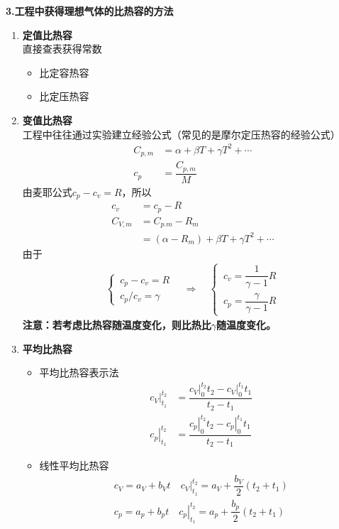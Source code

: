 \noindent \textbf{3.工程中获得理想气体的比热容的方法}
\vspace*{-0.5em}
\begin{enumerate}
	\item \textbf{定值比热容}\\
	直接查表获得常数
	\vspace*{-0.5em}
	\begin{itemize}
		\item 比定容热容
		\item 比定压热容
	\end{itemize}

	\item \textbf{变值比热容}\\
	工程中往往通过实验建立经验公式（常见的是摩尔定压热容的经验公式）
	\begin{align}
		C_{p,m} &= \alpha + \beta T + \gamma T^2 + \cdots\\
		c_p &= \dfrac{C_{p,m}}{M}
	\end{align}
	由麦耶公式$c_p - c_v = R$，所以
	\begin{align}
		c_v &= c_p - R\\
		C_{V,m} &= C_{p.m} - R_m \\
		&= (\alpha - R_m) + \beta T + \gamma T^2 + \cdots
	\end{align}
	由于
	\begin{align*}
		\begin{cases}
			\, c_p - c_v = R\\
			\, c_p / c_v = \gamma 
		\end{cases}
	\quad 
	\Rightarrow
	\quad
	\begin{cases}
		\, c_v = \dfrac{1}{\gamma -1 } R \\[0.5em]
		\, c_p = \dfrac{\gamma}{\gamma - 1} R
	\end{cases}
	\end{align*}
	\textbf{注意：若考虑比热容随温度变化，则比热比$\gamma$随温度变化。}
	
	\item \textbf{平均比热容}\\
	\begin{itemize}
		\item 平均比热容表示法
		\begin{align}
			\left. c_V \right|_{t_1}^{t_2} &= \dfrac{\left. c_V \right|_{0}^{t_2}t_2 - \left. c_V \right|_{0}^{t_1} t_1}{t_2 - t_1}\\[1em]
			\left. c_p \right|_{t_1}^{t_2} &= \dfrac{\left. c_p \right|_{0}^{t_2}t_2 - \left. c_p \right|_{0}^{t_1} t_1}{t_2 - t_1}
		\end{align}
		
		\item 线性平均比热容
		\begin{align}
			c_V = a_V + b_V t \quad \left. c_V \right|_{t_1}^{t_2} = a_V + \dfrac{b_V}{2}(t_2+t_1) \\[1em]
			c_p = a_p + b_p t \quad \left. c_p \right|_{t_1}^{t_2} = a_p + \dfrac{b_p}{2}(t_2+t_1) 
		\end{align}
	\end{itemize}
\end{enumerate}

